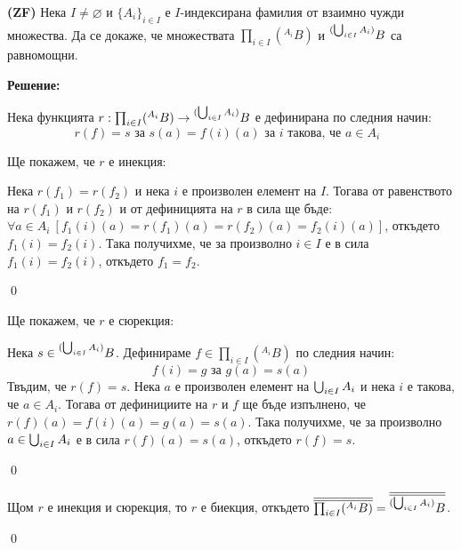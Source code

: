 \begin{problem}
\textbf{(ZF)}
Нека $I \ne \varnothing$ и $\{A_i\}_{i \in I}$ е $I$-индексирана фамилия от взаимно чужди множества.
Да се докаже, че множествата $\prod_{i \in I} ({}^{A_i} B)$ и ${}^{(\bigcup_{i \in I} A_i)} B$ са равномощни.
\end{problem}

\textbf{Решение:}

\smallbreak
\quad
Нека функцията
$r: \prod_{i \in I} ({}^{A_i} B) \to {}^{(\bigcup_{i \in I} A_i)} B$
е дефинирана по следния начин:
\[
r(f) = s \text{ за }
s(a) = f(i)(a) \text{ за $i$ такова, че $a \in A_i$ }
\]

\quad
Ще покажем, че $r$ е инекция:

\begin{tcolorbox}[mybox={Доказателство:}]
\quad
Нека $r(f_1) = r(f_2)$ и нека $i$ е произволен елемент на $I$.
Тогава от равенството на $r(f_1)$ и $r(f_2)$ и от дефиницията на $r$ в сила ще бъде:
$\forall a \in A_i\ [ f_1(i)(a) = r(f_1)(a) = r(f_2)(a) = f_2(i)(a)]$,
откъдето $f_1(i) = f_2(i)$.
Така получихме, че за произволно $i \in I$ е в сила $f_1(i) = f_2(i)$, откъдето
$f_1 = f_2$.

\qed
\end{tcolorbox}

\quad
Ще покажем, че $r$ е сюрекция:

\begin{tcolorbox}[mybox={Доказателство:}]
\quad
Нека $s \in {}^{(\bigcup_{i \in I} A_i)} B$.
Дефинираме $f \in \prod_{i \in I} ({}^{A_i} B)$ по следния начин:
\[
f(i) = g \text{ за }
g(a) = s(a)
\]
\quad
Твъдим, че $r(f) = s$.
Нека $a$ е произволен елемент на $\bigcup_{i \in I} A_i$ и нека $i$ е такова, че $a \in A_i$.
Тогава от дефинициите на $r$ и $f$ ще бъде изпълнено, че $r(f)(a) = f(i)(a) = g(a) = s(a)$.
Така получихме, че за произволно $a \in \bigcup_{i \in I} A_i$ е в сила $r(f)(a) = s(a)$, откъдето $r(f) = s$.

\qed
\end{tcolorbox}


\quad
Щом $r$ е инекция и сюрекция, то $r$ е биекция, откъдето
$\overline{\overline{\prod_{i \in I} ({}^{A_i} B)}} = \overline{\overline{{}^{(\bigcup_{i \in I} A_i)} B}}$.

\qed
